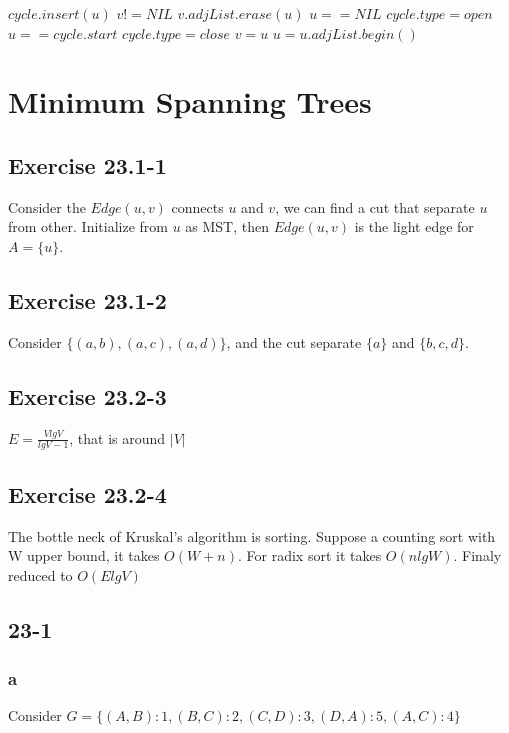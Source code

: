 \documentclass[]{article}
\begin{document}
\begin{codebox}
	
	\li $cycle.insert(u)$
	\li \If $v != NIL$ 
	\li \Then $v.adjList.erase(u)$ \End
	\li \If $u == NIL$ 
	\li \Then $cycle.type = open$
	\li \Return  
	\li \ElseIf $u == cycle.start$ 
	\li \Then $cycle.type = close$
	\li \Return 
	\li \Else $v = u$
	\li $u = u.adjList.begin()$
	\li {}
	\End
	\End
	
\end{codebox}

\section{Minimum Spanning Trees}

\subsection{Exercise 23.1-1}
Consider the $Edge(u,v)$ connects $u$ and $v$, we can find a cut that separate $u$ from other. Initialize from $u$ as MST, then $Edge(u,v)$ is the light edge for $A=\{u\}$.

\subsection{Exercise 23.1-2}
Consider $\{(a,b), (a,c), (a,d)\}$, and the cut separate $\{a\}$ and $\{b,c,d\}$.

\subsection{Exercise 23.2-3}
$E = \frac{VlgV}{lgV-1}$, that is around $|V|$

\subsection{Exercise 23.2-4}
The bottle neck of Kruskal's algorithm is sorting. Suppose a counting sort with W upper bound, it takes $O(W+n)$. For radix sort it takes $O(nlgW)$. Finaly reduced to $O(ElgV)$

\subsection{23-1}
\subsubsection{a}
Consider $G = \{(A,B):1, (B,C):2, (C,D):3, (D,A):5, (A,C):4\}$
\end{document}
